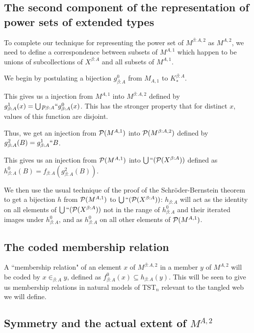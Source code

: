 \documentclass[12pt]{article}
\begin{document}
\subsection{The second component of the representation of power sets of extended types}

To complete our technique for representing the power set of $M^{\beta:A,2}$ as $M^{A,2}$, we need to define a correspondence between subsets of $M^{A,1}$ which happen to be unions of subcollections of $X^{\beta:A}$ and all subsets of $M^{A,1}$.

We begin by postulating a bijection $g^0_{\beta:A}$ from $M_{A,1}$ to $K^{\beta:A}_*$.

This gives us a injection from $M^{A,1}$ into $M^{\beta:A,2}$ defined by $g^1_{\beta:A}(x) = \bigcup p_{\beta:A}``g^0_{\beta:A}(x)$.  This has the stronger property
that for distinct $x$, values of this function are disjoint.

Thus, we get an injection from ${\cal P}(M^{A,1})$ into ${\cal P}(M^{\beta:A,2})$ defined by $g^2_{\beta:A}(B) = g^1_{\beta:A}``B$.

This gives us an injection from  ${\cal P}(M^{A,1})$ into $\bigcup``({\cal P}(X^{\beta:A}))$ defined as $h^0_{\beta:A}(B) = f_{\beta:A}(g^2_{\beta:A}(B))$.

We then use the usual technique of the proof of the Schr\"oder-Bernstein theorem to get a bijection $h$ from  ${\cal P}(M^{A,1})$ to $\bigcup``({\cal P}(X^{\beta:A}))$:
$h_{\beta:A}$ will act as the identity on all elements of $\bigcup``({\cal P}(X^{\beta:A}))$ not in the range of $h^0_{\beta:A}$ and their iterated images under $h^0_{\beta:A}$,
and as $h^0_{\beta:A}$ on all other elements of ${\cal P}(M^{A,1})$.

\subsection{The coded membership relation}

A ``membership relation"  of an element $x$ of $M^{\beta:A,2}$ in a member $y$ of $M^{A,2}$ will  be coded by $x \in_{\beta:A} y$, defined as $f^0_{\beta:A}(x) \subseteq h_{\beta:A}(y)$.  This will be seen to give us membership relations in natural models of TST$_n$ relevant to the tangled web we will define.

\subsection{Symmetry and the actual extent of $M^{A,2}$}
\end{document}
